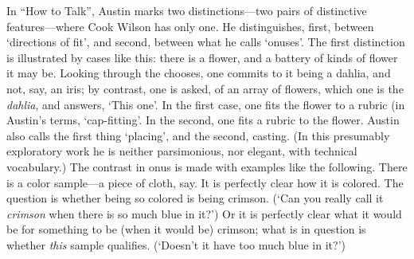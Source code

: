 In “How to Talk”, Austin marks two distinctions---two pairs of distinctive features---where Cook Wilson has only one. He distinguishes, first, between `directions of fit', and second, between what he calls `onuses'. The first distinction is illustrated by cases like this: there is a flower, and a battery of kinds of flower it may be. Looking through the chooses, one commits to it being a dahlia, and not, say, an iris; by contrast, one is asked, of an array of flowers, which one is the \emph{dahlia}, and answers, `This one'. In the first case, one fits the flower to a rubric (in Austin’s terms, `cap-fitting'. In the second, one fits a rubric to the flower. Austin also calls the first thing `placing', and the second, casting. (In this presumably exploratory work he is neither parsimonious, nor elegant, with technical vocabulary.) The contrast in onus is made with examples like the following. There is a color sample---a piece of cloth, say. It is perfectly clear how it is colored. The question is whether being so colored is being crimson. (`Can you really call it \emph{crimson} when there is so much blue in it?') Or it is perfectly clear what it would be for something to be (when it would be) crimson; what is in question is whether \emph{this} sample qualifies. (`Doesn’t it have too much blue in it?')

